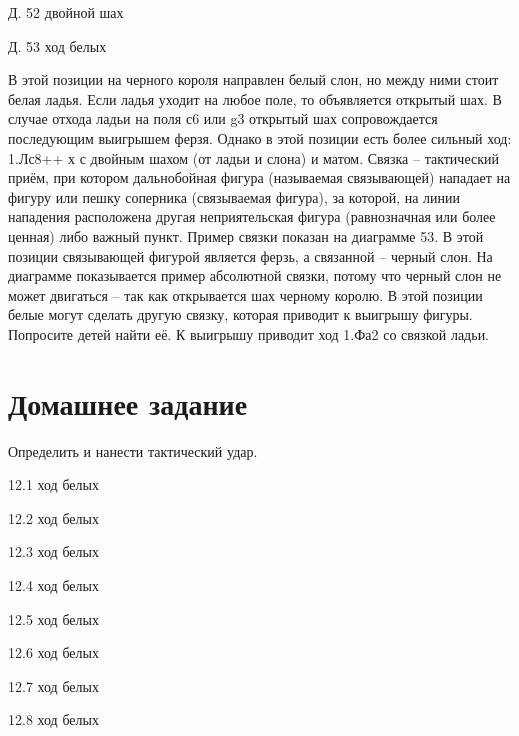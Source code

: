  
Д. 52 двойной шах
 
Д. 53 ход белых
 
В этой позиции на черного короля направлен белый слон, но между ними стоит белая ладья. Если ладья уходит на любое поле, то объявляется открытый шах. В случае отхода ладьи на поля с6 или g3 открытый шах сопровождается последующим выигрышем ферзя. Однако в этой позиции есть более сильный ход: 1.Лс8++ х с двойным шахом (от ладьи и слона) и матом.
Связка – тактический приём, при котором дальнобойная фигура (называемая связывающей) нападает на фигуру или пешку соперника (связываемая фигура), за которой, на линии нападения расположена другая неприятельская фигура (равнозначная или более ценная) либо важный пункт. Пример связки показан на диаграмме 53. 
В этой позиции связывающей фигурой является ферзь, а связанной – черный слон. На диаграмме показывается пример абсолютной связки, потому что черный слон не может двигаться – так как открывается шах черному королю. В этой позиции белые могут сделать другую связку, которая приводит к выигрышу фигуры. Попросите детей найти её. К выигрышу приводит ход 1.Фа2 со связкой ладьи.


\section{Домашнее задание}

Определить и нанести тактический удар.
 
 
12.1 ход белых
 
12.2 ход белых
 
 
12.3 ход белых
 
12.4 ход белых
 
 
12.5 ход белых
 
12.6 ход белых
 
 
12.7 ход белых
 
12.8 ход белых
